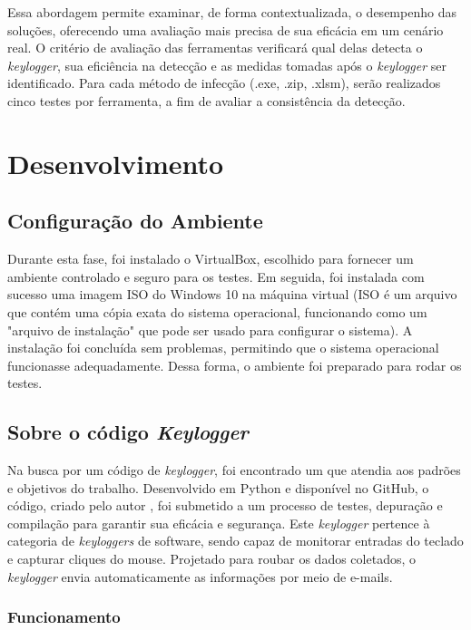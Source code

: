 \documentclass[12pt]{article}
\begin{document}
Essa abordagem permite examinar, 
de forma contextualizada, o desempenho das soluções, 
oferecendo uma avaliação mais precisa de sua eficácia em um cenário real. 
O critério de avaliação das ferramentas verificará qual delas detecta o \textit{keylogger}, 
sua eficiência na detecção e as medidas tomadas após o \textit{keylogger} ser identificado. 
Para cada método de infecção (.exe, .zip, .xlsm), serão realizados cinco testes por ferramenta, 
a fim de avaliar a consistência da detecção.
\section{Desenvolvimento}

\subsection{Configuração do Ambiente}

Durante esta fase, foi instalado o VirtualBox, escolhido para fornecer 
um ambiente controlado e seguro para os testes. Em seguida, foi instalada 
com sucesso uma imagem ISO do Windows 10 na máquina virtual (ISO é um arquivo 
que contém uma cópia exata do sistema operacional, funcionando como um "arquivo 
de instalação" que pode ser usado para configurar o sistema). 
A instalação foi concluída sem problemas, permitindo que o sistema operacional 
funcionasse adequadamente. Dessa forma, o ambiente foi preparado para rodar os testes.
\subsection{Sobre o código \textit{Keylogger}}

Na busca por um código de \textit{keylogger}, foi encontrado um que atendia aos padrões e objetivos do trabalho. Desenvolvido em Python e disponível no GitHub, o código, criado pelo autor \citep{Aydinnyunus}, foi submetido a um processo de testes, depuração e compilação para garantir sua eficácia e segurança. Este \textit{keylogger} pertence à categoria de \textit{keyloggers} de software, sendo capaz de monitorar entradas do teclado e capturar cliques do mouse. Projetado para roubar os dados coletados, o \textit{keylogger} envia automaticamente as informações por meio de e-mails.

\subsubsection{Funcionamento}
\end{document}
